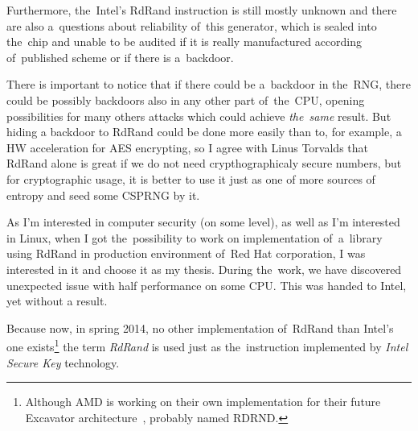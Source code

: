 \par{
Furthermore, the~Intel's RdRand instruction is still mostly unknown 
and there are also a~questions about reliability of~this generator, 
which is sealed into the~chip and unable to be audited\cite{TheodoreTsoNSA} 
if it is really manufactured according of~published 
scheme\cite{AnalysisOfDRNG} or if there is a~backdoor. 
}

\par{
There is important to notice that if there could be a~backdoor in the~RNG, 
there could be possibly backdoors also in any other part of~the~CPU, opening 
possibilities for many others attacks which could achieve {\em the~same} result. 
But hiding a backdoor to RdRand could be done more easily than to, 
for example, a HW acceleration for AES encrypting, so I agree with Linus 
Torvalds that RdRand alone is great if we do not need crypthographicaly secure 
numbers, but for cryptographic usage, it is better to use it just as one of more 
sources of entropy and seed some CSPRNG by it.
}

\par{
As I'm interested in computer security (on some level), 
as well as I'm interested in Linux, 
when I got the~possibility to work on implementation of~a~library using RdRand
in production environment of~Red Hat corporation, 
I was interested in it and choose it as my thesis. 
During the~work, we have discovered unexpected issue with half performance 
on some CPU. This was handed to Intel, yet without a result. 
}
\par{
Because now, in spring 2014, no other implementation of~RdRand than Intel's 
one exists\footnote{Although AMD is working on their own implementation 
for their future Excavator architecture~\cite{AMDRdRand}, probably named 
RDRND.}
the term {\em RdRand} is used just as the~instruction implemented 
by {\em Intel Secure Key} technology.
}


